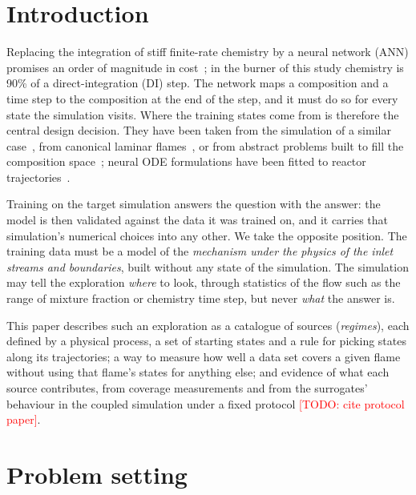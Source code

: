 \documentclass[preprint,review,12pt]{elsarticle}
\newcommand{\todo}[1]{\textcolor{red}{[TODO: #1]}}
\begin{document}
\section{Introduction}
\label{sec:intro}
Replacing the integration of stiff finite-rate chemistry by a neural network (ANN) promises an order of
magnitude in cost~\cite{christo1996ann,blasco1998ann}; in the burner of this study chemistry is 90\% of a
direct-integration (DI) step. The network maps a composition and a time step to the composition at the end of
the step, and it must do so for every state the simulation visits. Where the training states come from is
therefore the central design decision. They have been taken from the simulation of a similar
case~\cite{sen2010les}, from canonical laminar flames~\cite{ihme2009ann}, or from abstract problems built to
fill the composition space~\cite{franke2017rcce,ding2021hybrid,readshaw2021hybrid}; neural ODE formulations
have been fitted to reactor trajectories~\cite{owoyele2022chemnode}.

Training on the target simulation answers the question with the answer: the model is then validated against
the data it was trained on, and it carries that simulation's numerical choices into any other. We take the
opposite position. The training data must be a model of the \emph{mechanism under the physics of the inlet
streams and boundaries}, built without any state of the simulation. The simulation may tell the exploration
\emph{where} to look, through statistics of the flow such as the range of mixture fraction or chemistry time
step, but never \emph{what} the answer is.

This paper describes such an exploration as a catalogue of sources (\emph{regimes}), each defined by a physical
process, a set of starting states and a rule for picking states along its trajectories; a way to measure how
well a data set covers a given flame without using that flame's states for anything else; and evidence of what
each source contributes, from coverage measurements and from the surrogates' behaviour in the coupled
simulation under a fixed protocol \todo{cite protocol paper}.

\section{Problem setting}
\label{sec:setting}
\end{document}
